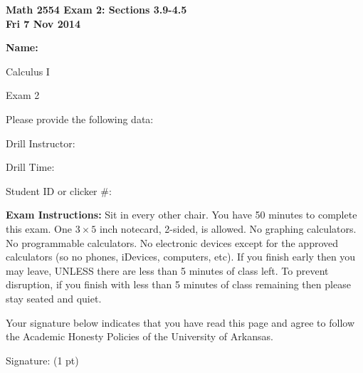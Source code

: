 \documentclass[11pt,letterpaper]{article}
\begin{document}
\flushleft
\begin{multicols}{2}

\begin{large}\textbf{Math 2554 Exam 2: Sections 3.9-4.5 \\
Fri 7 Nov 2014}\end{large}

\hfill\textbf{Name:  }\underline{\hspace{40ex}} %
\\
\vspace{.5in}

\end{multicols}

\pagestyle{empty}

\flushleft

\begin{center}\Large Calculus I 

Exam 2 \end{center}

\vspace{2pc}
Please provide the following data:

\vspace{2pc}
Drill Instructor: \underline{\hspace{40ex}}

\vspace{2pc}
Drill Time: \underline{\hspace{40ex}}

\vspace{2pc}
Student ID or clicker \#: \underline{\hspace{40ex}}

\vspace{3pc}
{\bf Exam Instructions:} Sit in every other chair.  You have 50 minutes to complete this exam.  One $3\times 5$ inch notecard, 2-sided, is allowed.  No graphing calculators.  No programmable calculators.  No electronic devices except for the approved calculators (so no phones, iDevices, computers, etc).  If you finish early then you may leave, UNLESS there are less than 5 minutes of class left.  To prevent disruption, if you finish with less than 5 minutes of class remaining then please stay seated and quiet.

\vspace{5pc}
Your signature below indicates that you have read this page and agree to follow the Academic Honesty Policies of the University of Arkansas.  

\vspace{3pc}
Signature: (1 pt) \underline{\hspace{80ex}}
\end{document}
